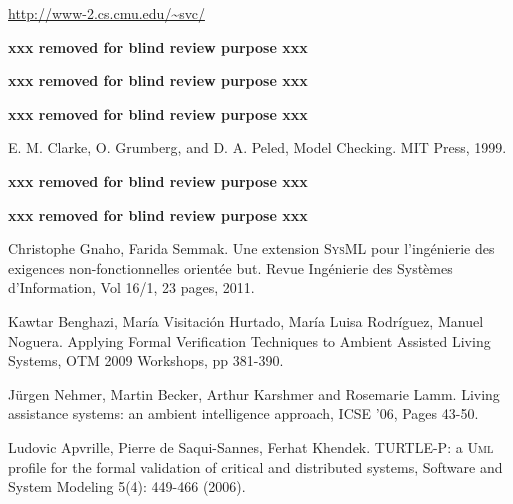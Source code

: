 \documentclass[a4paper,twoside]{article}
\def\myrelax{\textsc{Relax}}                  %
\def\sysml{\textsc{SysML}}
\def\UML{\textsc{Uml}}
\def\uml{\textsc{Uml}}
\newcommand{\final}[1]{\textbf{xxx removed for blind review purpose xxx}}
\begin{document}
%

\begin{thebibliography}{1}

\url{http://www-2.cs.cmu.edu/~svc/}

\final{Iulia Dragomir, Iulian Ober and David Lesens. A Case Study in Formal System Engineering with SysML, ICECCS 2012,Pages: 189 - 198.}

 \final{Iulian Ober and Iulia Dragomir. OMEGA2: A new version of the profile and the tools, ICECCS 2010,
DOI 10.1109/ICECCS.2010.59.}

  \final{Iulian Ober, Susanne Graf and Ileana Ober. Validating timed \uml{} models by simulation and verification, International Journal on Software Tools for Technology (2006) 8(2): 128–145}

E. M. Clarke, O. Grumberg, and D. A. Peled, Model Checking. MIT Press, 1999.

 \final{Jon Whittle, Pete Sawyer, Nelly Bencomo, Betty H.C. Cheng, and Jean-Michel Bruel. \myrelax{} : Incorporating Uncertainty into the Speciﬁcation of Self-Adaptive systems,RE Conference 2009, Pages: 79-88.}

 \final{Manzoor Ahmad, Jean Michel Bruel, R\'egine Laleau and Christophe Gnaho. Using RELAX, SysML and KAOS for Ambient Systems Requirements Modeling, Procedia Computer Science Volume 10, 2012, Pages 474–481.}

 Christophe Gnaho, Farida Semmak. Une extension \sysml{} pour l'ing\'enierie des exigences non-fonctionnelles orient\'ee but. Revue Ing\'enierie des Syst\`emes d'Information, Vol 16/1, 23 pages, 2011.

 Kawtar Benghazi, Mar\'ia Visitaci\'on Hurtado, Mar\'ia Luisa Rodr\'iguez, Manuel Noguera. Applying Formal Verification Techniques to Ambient Assisted Living Systems, OTM 2009 Workshops, pp 381-390.

 J\"urgen Nehmer, Martin Becker, Arthur Karshmer and Rosemarie Lamm. Living assistance systems: an ambient intelligence approach, ICSE '06, Pages 43-50. 


 Ludovic Apvrille, Pierre de Saqui-Sannes, Ferhat Khendek. TURTLE-P: a \UML{} profile for the formal validation of critical and distributed systems, Software and System Modeling 5(4): 449-466 (2006).


\end{thebibliography}
\end{document}
